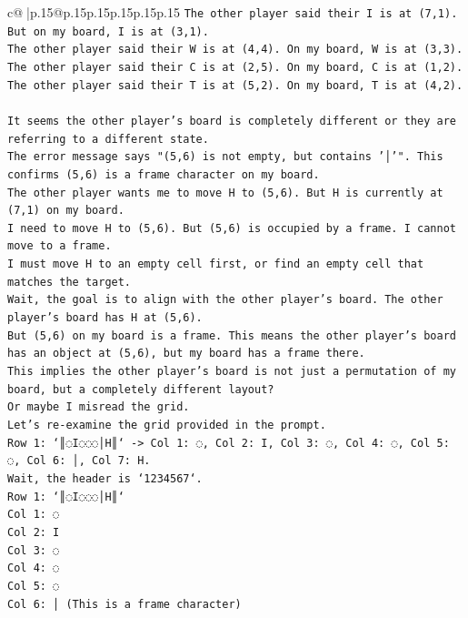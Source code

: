 \documentclass{article}
\begin{document}
{\begin{supertabular}{c@{$\;$}|p{.15\linewidth}@{}p{.15\linewidth}p{.15\linewidth}p{.15\linewidth}p{.15\linewidth}p{.15\linewidth}}
{{{\texttt{The other player said their I is at (7,1). But on my board, I is at (3,1).} \\
\texttt{The other player said their W is at (4,4). On my board, W is at (3,3).} \\
\texttt{The other player said their C is at (2,5). On my board, C is at (1,2).} \\
\texttt{The other player said their T is at (5,2). On my board, T is at (4,2).} \\
\\ 
\texttt{It seems the other player's board is completely different or they are referring to a different state.} \\
\texttt{The error message says "(5,6) is not empty, but contains '│'". This confirms (5,6) is a frame character on my board.} \\
\texttt{The other player wants me to move H to (5,6). But H is currently at (7,1) on my board.} \\
\texttt{I need to move H to (5,6). But (5,6) is occupied by a frame. I cannot move to a frame.} \\
\texttt{I must move H to an empty cell first, or find an empty cell that matches the target.} \\
\texttt{Wait, the goal is to align with the other player's board. The other player's board has H at (5,6).} \\
\texttt{But (5,6) on my board is a frame. This means the other player's board has an object at (5,6), but my board has a frame there.} \\
\texttt{This implies the other player's board is not just a permutation of my board, but a completely different layout?} \\
\texttt{Or maybe I misread the grid.} \\
\texttt{Let's re{-}examine the grid provided in the prompt.} \\
\texttt{Row 1: `║◌I◌◌◌│H║` {-}> Col 1: ◌, Col 2: I, Col 3: ◌, Col 4: ◌, Col 5: ◌, Col 6: │, Col 7: H.} \\
\texttt{Wait, the header is `1234567`.} \\
\texttt{Row 1: `║◌I◌◌◌│H║`} \\
\texttt{Col 1: ◌} \\
\texttt{Col 2: I} \\
\texttt{Col 3: ◌} \\
\texttt{Col 4: ◌} \\
\texttt{Col 5: ◌} \\
\texttt{Col 6: │ (This is a frame character)} \\
}}}
\end{supertabular}}
\end{document}
